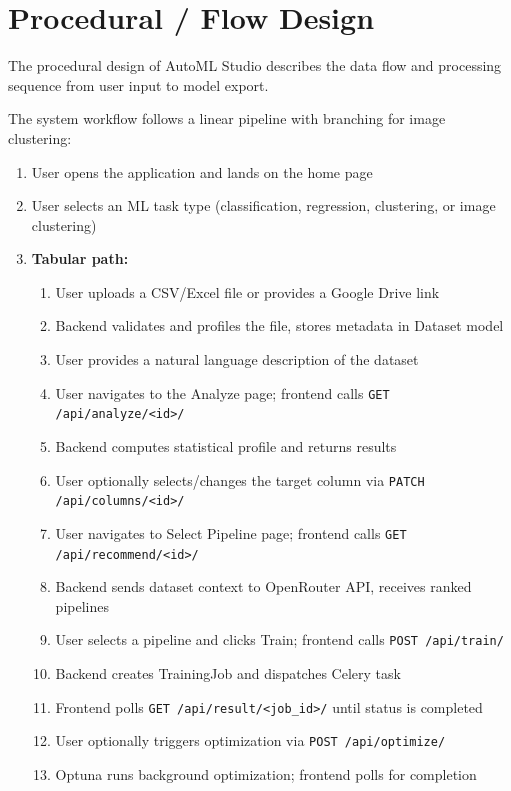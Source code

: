 \documentclass[12pt,a4paper]{report}
\begin{document}
\section{Procedural / Flow Design}

The procedural design of AutoML Studio describes the data flow and processing sequence from user input to model export.

The system workflow follows a linear pipeline with branching for image clustering:

\begin{enumerate}
    \item User opens the application and lands on the home page
    \item User selects an ML task type (classification, regression, clustering, or image clustering)
    \item \textbf{Tabular path:}
    \begin{enumerate}
        \item User uploads a CSV/Excel file or provides a Google Drive link
        \item Backend validates and profiles the file, stores metadata in Dataset model
        \item User provides a natural language description of the dataset
        \item User navigates to the Analyze page; frontend calls \texttt{GET /api/analyze/<id>/}
        \item Backend computes statistical profile and returns results
        \item User optionally selects/changes the target column via \texttt{PATCH /api/columns/<id>/}
        \item User navigates to Select Pipeline page; frontend calls \texttt{GET /api/recommend/<id>/}
        \item Backend sends dataset context to OpenRouter API, receives ranked pipelines
        \item User selects a pipeline and clicks Train; frontend calls \texttt{POST /api/train/}
        \item Backend creates TrainingJob and dispatches Celery task
        \item Frontend polls \texttt{GET /api/result/<job\_id>/} until status is completed
        \item User optionally triggers optimization via \texttt{POST /api/optimize/}
        \item Optuna runs background optimization; frontend polls for completion

\end{enumerate}
\end{enumerate}
\end{document}
